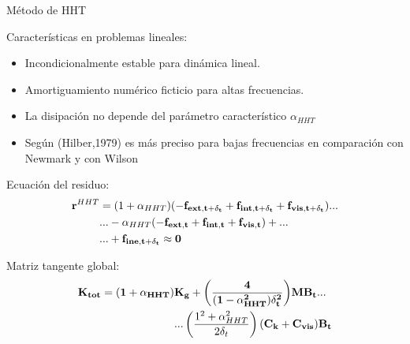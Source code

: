 \documentclass[
  aspectratio=169,
]{beamer}
\begin{document}
\begin{small}
\begin{frame}{Método de HHT}
	\begin{minipage}[t]{0.4\linewidth}
		\begin{block}{Características en problemas lineales:}
			\begin{itemize}
				\item Incondicionalmente estable para dinámica lineal.
				\item Amortiguamiento numérico ficticio para altas frecuencias. 
				\item La disipación no depende del parámetro característico $\alpha_{HHT}$
				\item Según {\color{blue} (Hilber,1979)} es más preciso para bajas frecuencias en comparación con Newmark y con Wilson
			\end{itemize}
		\end{block}
	\end{minipage}
	\hspace{1cm}
	\begin{minipage}[t]{0.5\linewidth}
		\vspace{-1.8cm}
		\begin{block}{Ecuación del residuo:}
			\begin{equation}
			\begin{split}
			\bf{r}^{\text{$HHT$}}&=(1+\alpha_\text{$HHT$})(-\bf{f}_{ext,t+\delta_t}+\bf{f}_{int,t+\delta_t}+\bf{f}_{vis,t+\delta_t})...\\
			&...-\alpha_\text{$HHT$}(-\bf{f}_{ext,t}+\bf{f}_{int,t}+\bf{f}_{vis,t})+...\\
			&...+\bf{f}_{ine,t+\delta_t}	\approx 0
			\end{split}
			\end{equation}
		\end{block}
		\begin{block}{Matriz tangente global:}
			\begin{equation}\label{Eq:MET:FinalIncremento}
			\begin{split}
			\bf{K}_{tot}= (1+\alpha_{HHT})&\bf{K}_g+{\left( \frac{4}{(1-\alpha_{HHT}^2) \delta_t^2} \right)} \bf{M}\bf{B}_t...\\ &...\left({\frac{1^2+\alpha^2_{HHT}}{2\delta_t}}\right) (\bf{C}_k+\bf{C}_{vis}) \bf{B}_t 
			\end{split}
			\end{equation}
		\end{block}
	\end{minipage}

\end{frame}
\end{small}
\end{document}
